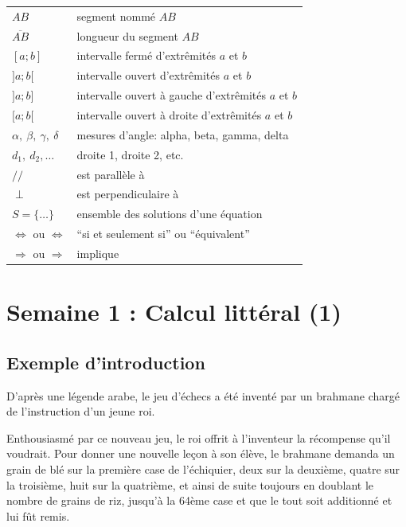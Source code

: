 \documentclass[
  12pt,
]{book}
\begin{document}
\begin{longtable}[]{@{}
  >{\raggedright\arraybackslash}p{}
  >{\raggedright\arraybackslash}p{}@{}}
\(AB\) & segment nommé \(AB\) \\
\(\overline{AB}\) & longueur du segment \(AB\) \\
\([a;b]\) & intervalle fermé d'extrêmités \(a\) et \(b\) \\
\(]a;b[\) & intervalle ouvert d'extrêmités \(a\) et \(b\) \\
\(]a;b]\) & intervalle ouvert à gauche d'extrêmités \(a\) et \(b\) \\
\([a;b[\) & intervalle ouvert à droite d'extrêmités \(a\) et \(b\) \\
\(\alpha,~\beta,~\gamma,~\delta\) & mesures d'angle: alpha, beta, gamma, delta \\
\(d_1,~d_2,\ldots\) & droite 1, droite 2, etc. \\
\(//\) & est parallèle à \\
\(\perp\) & est perpendiculaire à \\
\(S=\{\ldots\}\) & ensemble des solutions d'une équation \\
\(\Leftrightarrow\) ou \(\Longleftrightarrow\) & ``si et seulement si'' ou ``équivalent'' \\
\(\Rightarrow\) ou \(\Longrightarrow\) & implique \\
\bottomrule
\end{longtable}

\hypertarget{semaine-1-calcul-littuxe9ral-1}{%
\chapter{Semaine 1 : Calcul littéral (1)}\label{semaine-1-calcul-littuxe9ral-1}}

\hypertarget{exemple-dintroduction}{%
\section{Exemple d'introduction}\label{exemple-dintroduction}}

D'après une légende arabe, le jeu d'échecs a été inventé par un
brahmane chargé de l'instruction d'un jeune roi.

Enthousiasmé par ce nouveau jeu, le roi offrit à l'inventeur la
récompense qu'il voudrait. Pour donner une nouvelle leçon à son élève,
le brahmane demanda un grain de blé sur la première case de
l'échiquier, deux sur la deuxième, quatre sur la troisième, huit sur
la quatrième, et ainsi de suite toujours en doublant le nombre de
grains de riz, jusqu'à la 64ème case et que le tout soit additionné et
lui fût remis.
\end{document}
